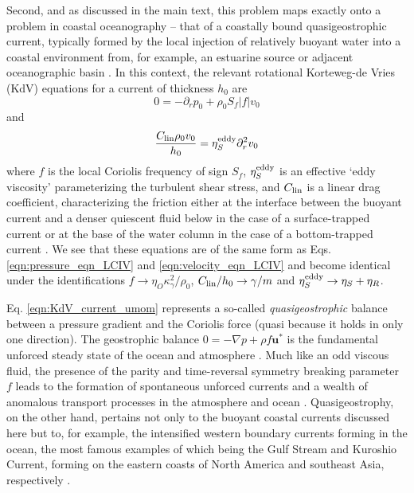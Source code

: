 \documentclass[%
 reprint,
superscriptaddress,
longbibliography,
 amsmath,amssymb,
 prl,
 citeautoscript,
]{revtex4-1}
\begin{document}
Second, and as discussed in the main text, this problem maps exactly onto a problem in coastal oceanography -- that of a coastally bound quasigeostrophic current, typically formed by the local injection of relatively buoyant water into a coastal environment from, for example, an estuarine source or adjacent oceanographic basin \cite{Alex_ARFM, Alex_JFM, coastal_current1, coastal_current2}. In this context, the relevant rotational Korteweg-de Vries (KdV) equations for a current of thickness $h_0$ are
\begin{equation}
0 = - \partial_r p_0 + \rho_0 S_f \left| f \right| v_0
\label{eqn:KdV_current_umom}
\end{equation}
and
\begin{equation}
\frac{C_{\rm lin} \rho_0 v_0}{h_0} = \eta_S^{\rm eddy} \partial_r^2 v_0
\label{eqn:KdV_current_vmom}
\end{equation}
where $f$ is the local Coriolis frequency of sign $S_f$, $\eta_S^{\rm eddy}$ is an effective `eddy viscosity' parameterizing the turbulent shear stress, and $C_{\rm lin}$ is a linear drag coefficient, characterizing the friction either at the interface between the buoyant current and a denser quiescent fluid below in the case of a surface-trapped current or at the base of the water column in the case of a bottom-trapped current \cite{coastal_current1, coastal_current1}. We see that these equations are of the same form as Eqs. \ref{eqn:pressure_eqn_LCIV} and \ref{eqn:velocity_eqn_LCIV} and become identical under the identifications $f \rightarrow \eta_O \kappa_{\gamma}^2 / \rho_0$, $C_{\rm lin} / h_0 \rightarrow \gamma / m$ and $\eta_S^{\rm eddy} \rightarrow \eta_S + \eta_R $.

Eq. \ref{eqn:KdV_current_umom} represents a so-called {\it quasigeostrophic} balance between a pressure gradient and the Coriolis force (quasi because it holds in only one direction). The geostrophic balance $0 = - \nabla p + \rho f {\boldsymbol u}^*$ is the fundamental unforced steady state of the ocean and atmosphere \cite{Gill}. Much like an odd viscous fluid, the presence of the parity and time-reversal symmetry breaking parameter $f$ leads to the formation of spontaneous unforced currents and a wealth of anomalous transport processes in the atmosphere and ocean \cite{Gill}. Quasigeostrophy, on the other hand, pertains not only to the buoyant coastal currents discussed here but to, for example, the intensified western boundary currents forming in the ocean, the most famous examples of which being the Gulf Stream and Kuroshio Current, forming on the eastern coasts of North America and southeast Asia, respectively \cite{Gill}.
\end{document}

